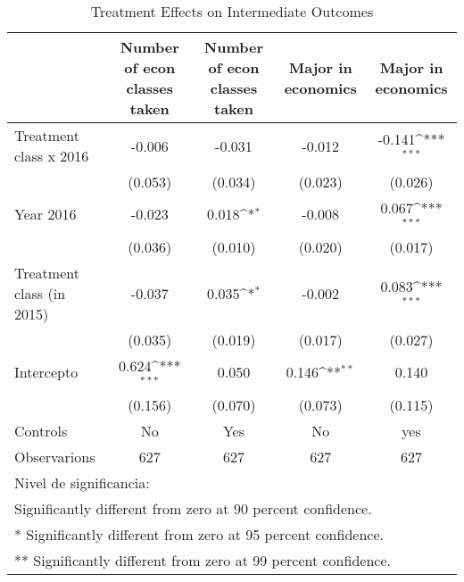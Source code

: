 \begin{table}[]
\caption{Treatment Effects on Intermediate Outcomes}
{
\def\sym#1{\ifmmode^{#1}\else\(^{#1}\)\fi}
\begin{tabular}{@{\extracolsep{2pt}}l*{4}{c}@{}}
\hline\hline


 & Number of econ classes taken & Number of econ classes taken & Major in economics & Major in economics \\
\hline
Treatment class x 2016 & -0.006 & -0.031 & -0.012 & -0.141\sym{***} \\
 & (0.053) & (0.034) & (0.023) & (0.026) \\
Year 2016 & -0.023 & 0.018\sym{*} & -0.008 & 0.067\sym{***} \\
 & (0.036) & (0.010) & (0.020) & (0.017) \\
Treatment class (in 2015) & -0.037 & 0.035\sym{*} & -0.002 & 0.083\sym{***} \\
 & (0.035) & (0.019) & (0.017) & (0.027) \\
Intercepto & 0.624\sym{***} & 0.050 & 0.146\sym{**} & 0.140 \\
 & (0.156) & (0.070) & (0.073) & (0.115) \\
Controls & No & Yes & No & yes \\

\hline
Observarions & 627 & 627 & 627 & 627 \\
\hline\hline
\multicolumn{5}{l}{\footnotesize Nivel de significancia:}\vspace{-.25em} \\
\multicolumn{5}{l}{\footnotesize * Significantly different from zero at 90 percent confidence.}\vspace{-.25em} \\
\multicolumn{5}{l}{\footnotesize ** Significantly different from zero at 95 percent confidence.}\vspace{-.25em} \\
\multicolumn{5}{l}{\footnotesize *** Significantly different from zero at 99 percent confidence.}
\end{tabular}
}
\end{table}